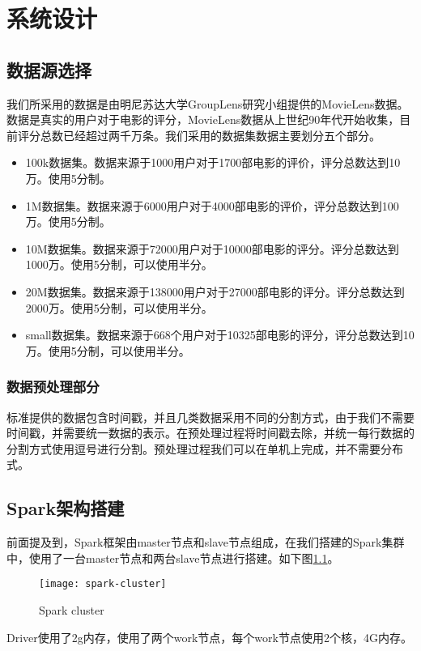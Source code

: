 \chapter{系统设计}
\section{数据源选择}
我们所采用的数据\cite{Harper:2016bm}是由明尼苏达大学GroupLens研究小组提供的MovieLens数据。数据是真实的用户对于电影的评分，MovieLens数据从上世纪90年代开始收集，目前评分总数已经超过两千万条。我们采用的数据集数据主要划分五个部分。
\begin{itemize}
    \item 100k数据集。数据来源于1000用户对于1700部电影的评价，评分总数达到10万。使用5分制。
    \item 1M数据集。数据来源于6000用户对于4000部电影的评价，评分总数达到100万。使用5分制。
    \item 10M数据集。数据来源于72000用户对于10000部电影的评分。评分总数达到1000万。使用5分制，可以使用半分。
    \item 20M数据集。数据来源于138000用户对于27000部电影的评分。评分总数达到2000万。使用5分制，可以使用半分。
    \item small数据集。数据来源于668个用户对于10325部电影的评分，评分总数达到10万。使用5分制，可以使用半分。
\end{itemize}

\subsection{数据预处理部分}
标准提供的数据包含时间戳，并且几类数据采用不同的分割方式，由于我们不需要时间戳，并需要统一数据的表示。在预处理过程将时间戳去除，并统一每行数据的分割方式使用逗号进行分割。预处理过程我们可以在单机上完成，并不需要分布式。

\section{Spark架构搭建}
前面提及到，Spark框架由master节点和slave节点组成，在我们搭建的Spark集群中，使用了一台master节点和两台slave节点进行搭建。如下图\ref{fig:cluster}。
\begin{figure}[ht]
\centering
\texttt{[image: spark-cluster]}
\caption{Spark cluster}\label{fig:cluster}
\end{figure}
Driver使用了2g内存，使用了两个work节点，每个work节点使用2个核，4G内存。

